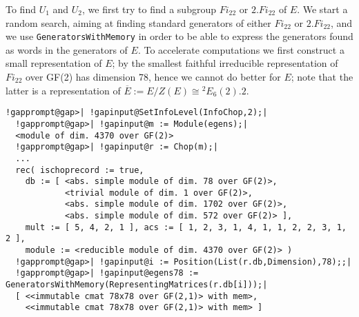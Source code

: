 \documentclass[a4paper,11pt]{report}
\begin{document}
{{ To find $U_1$ and $U_2$, we first try to find a subgroup $Fi_{{22}}$ or $2.Fi_{{22}}$ of $E$. We start a random search, aiming at finding standard generators of either $Fi_{{22}}$ or $2.Fi_{{22}}$, and we use \texttt{GeneratorsWithMemory} in order to be able to express the generators found as words in the generators
of $E$. To accelerate computations we first construct a small representation of $E$; by \cite{Jansen} the smallest faithful irreducible representation of $Fi_{{22}}$ over GF(2) has dimension 78, hence we cannot do better for $E$; note that the latter is a representation of $\overline{E}:=E/Z(E) \cong {}^2E_6(2).2$. 
\begin{Verbatim}[commandchars=!@|,fontsize=\small,frame=single,label=Example]
  !gapprompt@gap>| !gapinput@SetInfoLevel(InfoChop,2);|
  !gapprompt@gap>| !gapinput@m := Module(egens);|
  <module of dim. 4370 over GF(2)>
  !gapprompt@gap>| !gapinput@r := Chop(m);|
  ...
  rec( ischoprecord := true, 
    db := [ <abs. simple module of dim. 78 over GF(2)>, 
            <trivial module of dim. 1 over GF(2)>, 
            <abs. simple module of dim. 1702 over GF(2)>, 
            <abs. simple module of dim. 572 over GF(2)> ], 
    mult := [ 5, 4, 2, 1 ], acs := [ 1, 2, 3, 1, 4, 1, 1, 2, 2, 3, 1, 2 ], 
    module := <reducible module of dim. 4370 over GF(2)> )
  !gapprompt@gap>| !gapinput@i := Position(List(r.db,Dimension),78);;|
  !gapprompt@gap>| !gapinput@egens78 := GeneratorsWithMemory(RepresentingMatrices(r.db[i]));|
  [ <<immutable cmat 78x78 over GF(2,1)> with mem>, 
    <<immutable cmat 78x78 over GF(2,1)> with mem> ] 
\end{Verbatim}
 

}}
\end{document}
